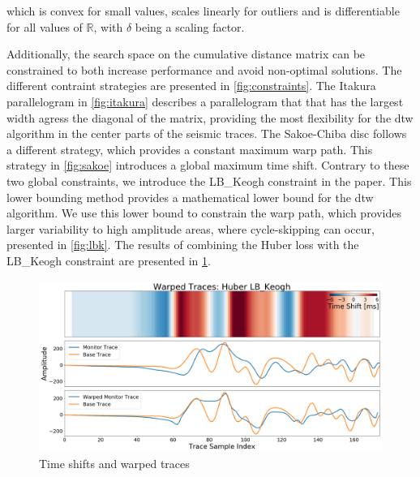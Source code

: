 which is convex for small values, scales linearly for outliers and is differentiable for all values of $\mathbb{R}$, with $\delta$ being a scaling factor.

Additionally, the search space on the cumulative distance matrix can be constrained to both increase performance and avoid non-optimal solutions. The different contraint strategies are presented in \cref{fig:constraints}. The Itakura parallelogram \citep{Itakura1975} in \cref{fig:itakura} describes a parallelogram that that has the largest width agress the diagonal of the matrix, providing the most flexibility for the \ac{dtw} algorithm in the center parts of the seismic traces. The Sakoe-Chiba disc \citep{Sakoe1978} follows a different strategy, which provides a constant maximum warp path. This strategy in \cref{fig:sakoe} introduces a global maximum time shift. Contrary to these two global constraints, we introduce the LB\_Keogh \citep{keogh2005exact} constraint in the paper. This lower bounding method provides a mathematical lower bound for the \ac{dtw} algorithm. We use this lower bound to constrain the warp path, which provides larger variability to high amplitude areas, where cycle-skipping can occur, presented in \cref{fig:lbk}. The results of combining the Huber loss with the LB\_Keogh constraint are presented in \cref{fig:time-shifts-warped}.

\begin{figure}[!ht]
    \centering
    \includegraphics[width=\textwidth]{figures/time_shift_huber_lb_keogh.png}
    \caption{Time shifts and warped traces \citep[from][]{dramsch2019dtw}}
    \label{fig:time-shifts-warped}
\end{figure}

